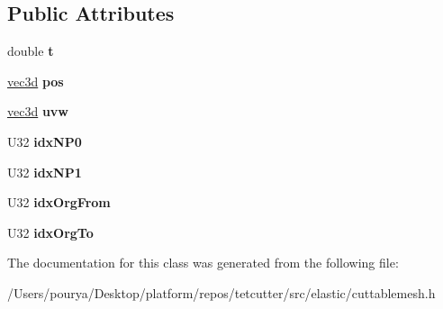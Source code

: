 \subsection*{Public Attributes}
\begin{DoxyCompactItemize}
\item 
\hypertarget{classps_1_1CuttableMesh_1_1CutEdge_aee3c47d802a4a83b971b4c0ba2bf8b86}{}double {\bfseries t}\label{classps_1_1CuttableMesh_1_1CutEdge_aee3c47d802a4a83b971b4c0ba2bf8b86}

\item 
\hypertarget{classps_1_1CuttableMesh_1_1CutEdge_a09cb54942adc2afa59a4166974292051}{}\hyperlink{classps_1_1base_1_1Vec3}{vec3d} {\bfseries pos}\label{classps_1_1CuttableMesh_1_1CutEdge_a09cb54942adc2afa59a4166974292051}

\item 
\hypertarget{classps_1_1CuttableMesh_1_1CutEdge_a84bd5c9aba43849077a1051c1552da7a}{}\hyperlink{classps_1_1base_1_1Vec3}{vec3d} {\bfseries uvw}\label{classps_1_1CuttableMesh_1_1CutEdge_a84bd5c9aba43849077a1051c1552da7a}

\item 
\hypertarget{classps_1_1CuttableMesh_1_1CutEdge_a7e455c3293aaad4f9a3cf6b50cfb5247}{}U32 {\bfseries idx\+N\+P0}\label{classps_1_1CuttableMesh_1_1CutEdge_a7e455c3293aaad4f9a3cf6b50cfb5247}

\item 
\hypertarget{classps_1_1CuttableMesh_1_1CutEdge_ad169246e0116867b2ca1baf027cc9dfb}{}U32 {\bfseries idx\+N\+P1}\label{classps_1_1CuttableMesh_1_1CutEdge_ad169246e0116867b2ca1baf027cc9dfb}

\item 
\hypertarget{classps_1_1CuttableMesh_1_1CutEdge_a102f388100e24fb5720086077d8b223b}{}U32 {\bfseries idx\+Org\+From}\label{classps_1_1CuttableMesh_1_1CutEdge_a102f388100e24fb5720086077d8b223b}

\item 
\hypertarget{classps_1_1CuttableMesh_1_1CutEdge_a8bfe7e209ed9f5fc8338b8d770d5ff34}{}U32 {\bfseries idx\+Org\+To}\label{classps_1_1CuttableMesh_1_1CutEdge_a8bfe7e209ed9f5fc8338b8d770d5ff34}

\end{DoxyCompactItemize}


The documentation for this class was generated from the following file\+:\begin{DoxyCompactItemize}
\item 
/\+Users/pourya/\+Desktop/platform/repos/tetcutter/src/elastic/cuttablemesh.\+h\end{DoxyCompactItemize}
